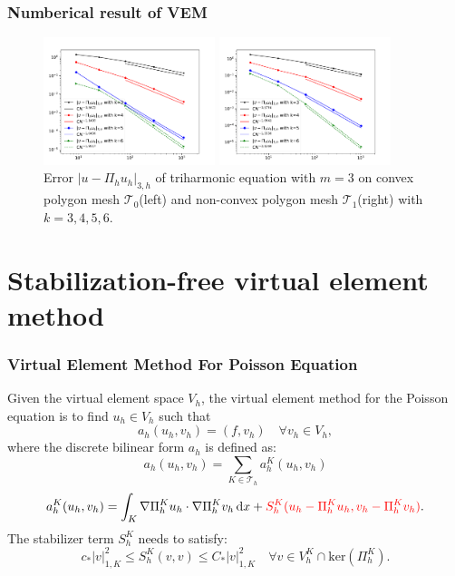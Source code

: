 \documentclass[notheorems,serif]{beamer}
\newcommand{\highlightit}{\textcolor[rgb]{1.00,0.00,0.00}}
\begin{document}
\begin{CJK}{UTF8}{gkai}
\begin{frame}
  \frametitle{Numberical result of VEM}
\begin{figure}[htbp]
\centering
\begin{minipage}[t]{0.49\linewidth}
\centering
\includegraphics[width=5cm]{../figures/H3_convex.pdf}
\end{minipage}%
\begin{minipage}[t]{0.49\linewidth}
\centering
\includegraphics[width=5cm]{../figures/H3_nonconvex.pdf}
\end{minipage}%
\centering
\caption{Error $|u - \Pi_h u_h|_{3, h}$ of 
    triharmonic equation with $m=3$ on convex polygon mesh $\mathcal T_0$(left) 
and non-convex polygon mesh $\mathcal T_1$(right) with $k = 3, 4, 5, 6$.}
\label{fig:H3error}
\end{figure}
\end{frame}
\section{Stabilization-free virtual element method}
\begin{frame}
\frametitle{Virtual Element Method For Poisson Equation}
Given the virtual element space $V_h$, the virtual element method for the
Poisson equation is to find $u_h \in V_h$ such that
$$
a_h(u_h, v_h) = (f, v_h) \quad \forall v_h \in V_h,
$$
where the discrete bilinear form $a_h$ is defined as:
$$
a_h(u_h, v_h) = \sum_{K \in \mathcal{T}_h} a_h^K(u_h, v_h)
$$
$$
a_h^K(u_h, v_h) = \int_K \nabla \Pi_h^K u_h \cdot \nabla \Pi_h^K v_h \, \mathrm{d}x + \highlightit{S_h^K(u_h - \Pi_h^K u_h, v_h - \Pi_h^K v_h)}.
$$
The stabilizer term $S_h^K$ needs to satisfy:
$$
c_* |v|_{1, K}^2 \leq S_h^K(v, v) \leq C_* |v|_{1, K}^2 \quad \forall v \in 
V_h^K \cap \mathrm{ker}(\Pi_h^K).
$$
\end{frame}


\end{CJK}
\end{document}
